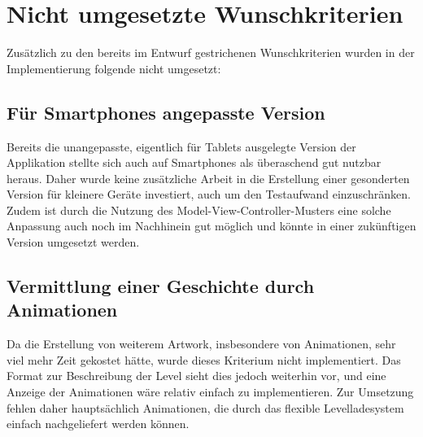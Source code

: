 \section{Nicht umgesetzte Wunschkriterien}

Zusätzlich zu den bereits im Entwurf gestrichenen Wunschkriterien wurden in der Implementierung folgende nicht umgesetzt:

\subsection{Für Smartphones angepasste Version}

Bereits die unangepasste, eigentlich für Tablets ausgelegte Version der Applikation stellte sich auch auf Smartphones als überaschend gut nutzbar heraus.
Daher wurde keine zusätzliche Arbeit in die Erstellung einer gesonderten Version für kleinere Geräte investiert, auch um den Testaufwand einzuschränken.
Zudem ist durch die Nutzung des Model-View-Controller-Musters eine solche Anpassung auch noch im Nachhinein gut möglich und könnte in einer zukünftigen Version umgesetzt werden.

\subsection{Vermittlung einer Geschichte durch Animationen}

Da die Erstellung von weiterem Artwork, insbesondere von Animationen, sehr viel mehr Zeit gekostet hätte, wurde dieses Kriterium nicht implementiert.
Das Format zur Beschreibung der Level sieht dies jedoch weiterhin vor, und eine Anzeige der Animationen wäre relativ einfach zu implementieren.
Zur Umsetzung fehlen daher hauptsächlich Animationen, die durch das flexible Levelladesystem einfach nachgeliefert werden können.
